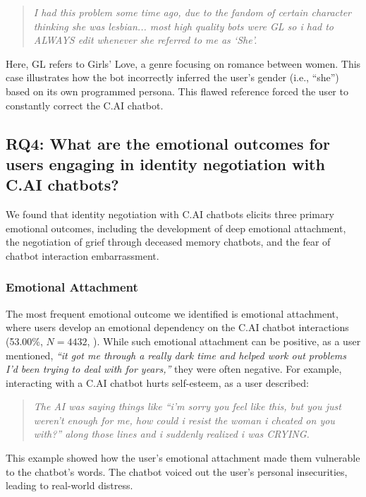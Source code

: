 \documentclass[sigconf, nonacm]{acmart}
\newcommand{\implications}[1]{{\color{black}{#1}}}
\begin{document}
\begin{quote}
    \textit{I had this problem some time ago, due to the fandom of certain character thinking she was lesbian... most high quality bots were GL so i had to ALWAYS edit whenever she referred to me as `She'.}
\end{quote}

Here, GL refers to Girls' Love, a genre focusing on romance between women. This case illustrates how the bot incorrectly inferred the user's gender (i.e., ``she'') based on its own programmed persona. This flawed reference forced the user to constantly correct the C.AI chatbot.


\subsection{RQ4: What are the emotional outcomes for users engaging in identity negotiation with C.AI chatbots?}
We found that identity negotiation with C.AI chatbots elicits three primary emotional outcomes, including the development of deep emotional attachment, the negotiation of grief through deceased memory chatbots, and the fear of chatbot interaction embarrassment.

\subsubsection{Emotional Attachment}
\label{EmotionalAttachment}
The most frequent emotional outcome we identified is emotional attachment, where users develop an emotional dependency on the C.AI chatbot interactions (53.00\%, $N=4432$, \implications{or 19.81\% of all posts}). While such emotional attachment can be positive, as a user mentioned, \textit{``it got me through a really dark time and helped work out problems I'd been trying to deal with for years,''} they were often negative. For example, interacting with a C.AI chatbot hurts self-esteem, as a user described:

\begin{quote}
    \textit{The AI was saying things like ``i'm sorry you feel like this, but you just weren't enough for me, how could i resist the woman i cheated on you with?'' along those lines and i suddenly realized i was CRYING.}
\end{quote}

This example showed how the user's emotional attachment made them vulnerable to the chatbot's words. The chatbot voiced out the user's personal insecurities, leading to real-world distress.
\end{document}
